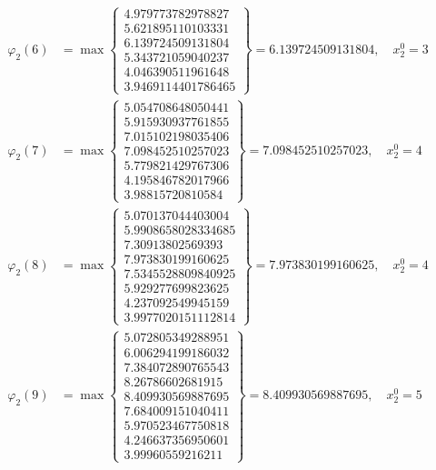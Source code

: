 \documentclass{article}
\begin{document}
\begin{align*}
  
\varphi_{2}(6) &= \max \left\{ \begin{array}{c}
4.979773782978827 \\
 5.621895110103331 \\
 6.139724509131804 \\
 5.343721059040237 \\
 4.046390511961648 \\
 3.9469114401786465
\end{array} \right\} = 6.139724509131804, \quad x_{2}^0 = 3\\
  
  
  
  
\varphi_{2}(7) &= \max \left\{ \begin{array}{c}
5.054708648050441 \\
 5.915930937761855 \\
 7.015102198035406 \\
 7.098452510257023 \\
 5.779821429767306 \\
 4.195846782017966 \\
 3.98815720810584
\end{array} \right\} = 7.098452510257023, \quad x_{2}^0 = 4\\
  
  
  
  
\varphi_{2}(8) &= \max \left\{ \begin{array}{c}
5.070137044403004 \\
 5.9908658028334685 \\
 7.30913802569393 \\
 7.973830199160625 \\
 7.5345528809840925 \\
 5.929277699823625 \\
 4.237092549945159 \\
 3.9977020151112814
\end{array} \right\} = 7.973830199160625, \quad x_{2}^0 = 4\\
  
  
  
  
\varphi_{2}(9) &= \max \left\{ \begin{array}{c}
5.072805349288951 \\
 6.006294199186032 \\
 7.384072890765543 \\
 8.26786602681915 \\
 8.409930569887695 \\
 7.684009151040411 \\
 5.970523467750818 \\
 4.246637356950601 \\
 3.99960559216211
\end{array} \right\} = 8.409930569887695, \quad x_{2}^0 = 5\\
  

\end{align*}
\end{document}

